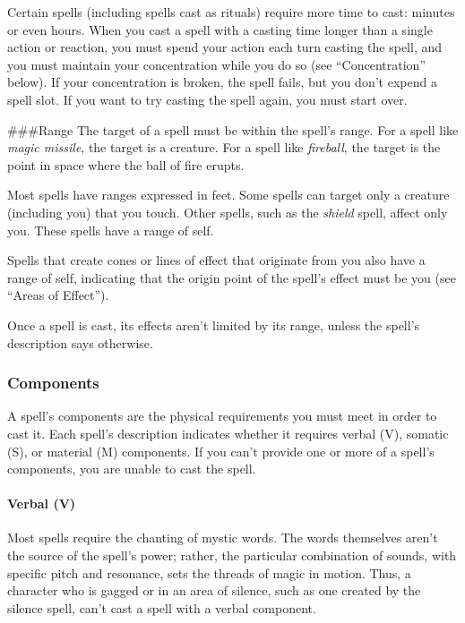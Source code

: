 \documentclass[
]{article}
\begin{document}
Certain spells (including spells cast as rituals) require more time to
cast: minutes or even hours. When you cast a spell with a casting time
longer than a single action or reaction, you must spend your action each
turn casting the spell, and you must maintain your concentration while
you do so (see ``Concentration'' below). If your concentration is
broken, the spell fails, but you don't expend a spell slot. If you want
to try casting the spell again, you must start over.

\#\#\#Range The target of a spell must be within the spell's range. For
a spell like \emph{magic missile}, the target is a creature. For a spell
like \emph{fireball}, the target is the point in space where the ball of
fire erupts.

Most spells have ranges expressed in feet. Some spells can target only a
creature (including you) that you touch. Other spells, such as the
\emph{shield} spell, affect only you. These spells have a range of self.

Spells that create cones or lines of effect that originate from you also
have a range of self, indicating that the origin point of the spell's
effect must be you (see ``Areas of Effect'').

Once a spell is cast, its effects aren't limited by its range, unless
the spell's description says otherwise.

\hypertarget{components}{%
\subsubsection{Components}\label{components}}

A spell's components are the physical requirements you must meet in
order to cast it. Each spell's description indicates whether it requires
verbal (V), somatic (S), or material (M) components. If you can't
provide one or more of a spell's components, you are unable to cast the
spell.

\hypertarget{verbal-v}{%
\paragraph{Verbal (V)}\label{verbal-v}}

Most spells require the chanting of mystic words. The words themselves
aren't the source of the spell's power; rather, the particular
combination of sounds, with specific pitch and resonance, sets the
threads of magic in motion. Thus, a character who is gagged or in an
area of silence, such as one created by the silence spell, can't cast a
spell with a verbal component.
\end{document}
